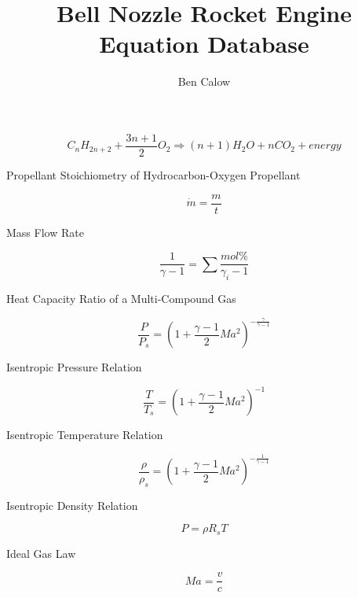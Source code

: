 \documentclass{article}
\title{Bell Nozzle Rocket Engine Equation Database}
\author{Ben Calow}
\begin{document}
\clearpage\maketitle
\thispagestyle{empty}

\pagebreak
\setcounter{page}{1}

\begin{equation}
    C_n H_{2n+2} + \frac{3n + 1}{2} O_2 \Longrightarrow \left(n + 1\right) H_2 O + n C O_2 + energy
\end{equation}

Propellant Stoichiometry of Hydrocarbon-Oxygen Propellant \cite{fuelmixes}

\begin{equation}
    \dot{m} = \frac{m}{t}
\end{equation}

Mass Flow Rate  

\begin{equation}
    \frac{1}{\gamma - 1} = \sum \frac{mol\%}{\gamma_i - 1}
\end{equation}

Heat Capacity Ratio of a Multi-Compound Gas \cite{heatratio}

\begin{equation}
    \frac{P}{P_s} = \left(1 + \frac{\gamma - 1}{2} Ma ^ 2\right) ^ {-\frac{\gamma}{\gamma - 1}}
\end{equation}

Isentropic Pressure Relation \cite{compressibleflow}

\begin{equation}
    \frac{T}{T_s} = \left(1 + \frac{\gamma - 1}{2} Ma ^ 2\right) ^ {-1}
\end{equation}

Isentropic Temperature Relation \cite{compressibleflow}

\begin{equation}
    \frac{\rho}{\rho_s} = \left(1 + \frac{\gamma - 1}{2} Ma ^ 2\right) ^ {-\frac{1}{\gamma - 1}}
\end{equation}

Isentropic Density Relation \cite{compressibleflow}

\begin{equation}
    P = \rho R_s T
\end{equation}

Ideal Gas Law

\begin{equation}
    Ma = \frac{v}{c}
\end{equation}
\end{document}
